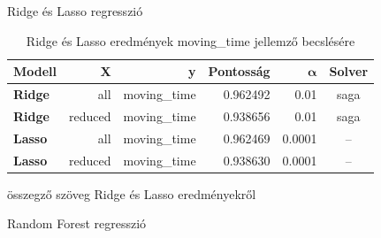Ridge és Lasso regresszió
\begin{table}[!h]
	\centering
	\begin{tabular}{|l|r|r|r|r|c|}
		\hline
		\textbf{Modell} & \textbf{X} & \textbf{y}   & \multicolumn{1}{l|}{\textbf{Pontosság}} & \textbf{$\boldsymbol\alpha$} & \multicolumn{1}{l|}{\textbf{Solver}} \\ \hline
		\textbf{Ridge}  & all        & moving\_time & 0.962492                                & 0.01              & saga                                 \\ \hline
		\textbf{Ridge}  & reduced    & moving\_time & 0.938656                                & 0.01              & saga                                 \\ \hline
		\textbf{Lasso}  & all        & moving\_time & 0.962469                                & 0.0001            & --                                   \\ \hline
		\textbf{Lasso}  & reduced    & moving\_time & 0.938630                                & 0.0001            & --                                   \\ \hline
	\end{tabular}
\caption{Ridge és Lasso eredmények moving\_time jellemző becslésére}
\end{table}

összegző szöveg Ridge és Lasso eredményekről

Random Forest regresszió


